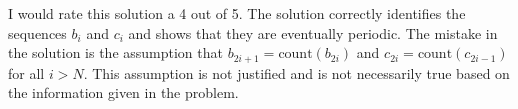 I would rate this solution a 4 out of 5. The solution correctly identifies the sequences $b_i$ and $c_i$ and shows that they are eventually periodic. The mistake in the solution is the assumption that $b_{2i+1} = \text{count}(b_{2i})$ and $c_{2i} = \text{count}(c_{2i-1})$ for all $i > N$. This assumption is not justified and is not necessarily true based on the information given in the problem.
